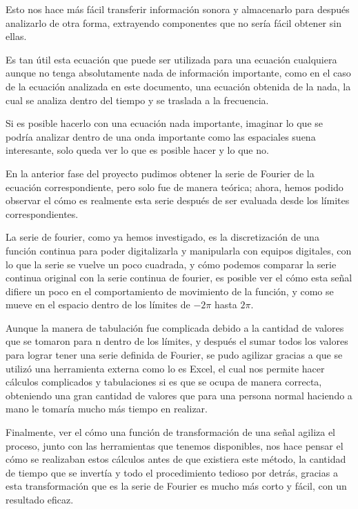 Esto nos hace más fácil transferir información sonora y almacenarlo para después analizarlo de otra forma, extrayendo componentes que no sería fácil obtener sin ellas.

Es tan útil esta ecuación que puede ser utilizada para una ecuación cualquiera aunque no tenga absolutamente nada de información importante, como en el caso de la ecuación analizada en este documento, una ecuación obtenida de la nada, la cual se analiza dentro del tiempo y se traslada a la frecuencia.

Si es posible hacerlo con una ecuación nada importante, imaginar lo que se podría analizar dentro de una onda importante como las espaciales suena interesante, solo queda ver lo que es posible hacer y lo que no.

En la anterior fase del proyecto pudimos obtener la serie de Fourier de la ecuación correspondiente, pero solo fue de manera teórica; ahora, hemos podido observar el cómo es realmente esta serie después de ser evaluada desde los límites correspondientes.

La serie de fourier, como ya hemos investigado, es la discretización de una función continua para poder digitalizarla y manipularla con equipos digitales, con lo que la serie se vuelve un poco cuadrada, y cómo podemos comparar la serie continua original con la serie continua de fourier, es posible ver el cómo esta señal difiere un poco en el comportamiento de movimiento de la función, y como se mueve en el espacio dentro de los límites de \(-2 \pi\) hasta \(2 \pi\).

Aunque la manera de tabulación fue complicada debido a la cantidad de valores que se tomaron para n dentro de los límites, y después el sumar todos los valores para lograr tener una serie definida de Fourier, se pudo agilizar gracias a que se utilizó una herramienta externa como lo es Excel, el cual nos permite hacer cálculos complicados y tabulaciones si es que se ocupa de manera correcta, obteniendo una gran cantidad de valores que para una persona normal haciendo a mano le tomaría mucho más tiempo en realizar.

Finalmente, ver el cómo una función de transformación de una señal agiliza el proceso, junto con las herramientas que tenemos disponibles, nos hace pensar el cómo se realizaban estos cálculos antes de que existiera este método, la cantidad de tiempo que se invertía y todo el procedimiento tedioso por detrás, gracias a esta transformación que es la serie de Fourier es mucho más corto y fácil, con un resultado eficaz.

